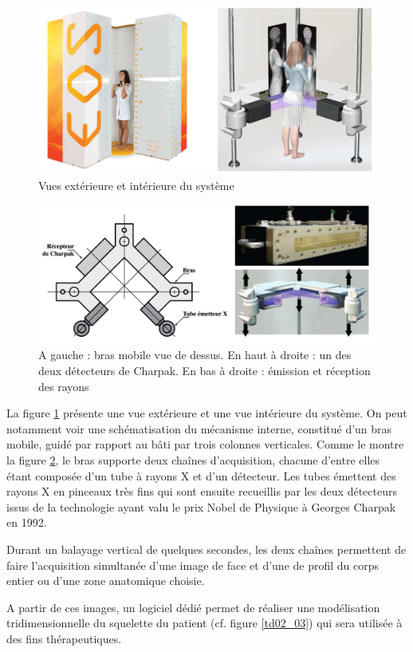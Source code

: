\begin{figure}[!h]
 \centering \includegraphics[width=0.8\linewidth]{img/td02_01}
 \caption{Vues extérieure et intérieure du système}
 \label{td02_01}
\end{figure}

\begin{figure}[!h]
 \centering \includegraphics[width=0.8\linewidth]{img/td02_02}
 \caption{A gauche : bras mobile vue de dessus. En haut à droite : un des deux détecteurs de Charpak. En bas à droite : émission et réception des rayons}
 \label{td02_02}
\end{figure}

La figure \ref{td02_01} présente une vue extérieure et une vue intérieure du système. On peut notamment voir une
schématisation du mécanisme interne, constitué d'un bras mobile, guidé par rapport au bâti par trois colonnes
verticales. Comme le montre la figure \ref{td02_02}, le bras supporte deux chaînes d'acquisition, chacune d'entre elles étant composée d'un tube à rayons X et d'un détecteur. Les tubes émettent des rayons X en pinceaux très fins qui sont ensuite recueillis par les deux détecteurs issus de la technologie ayant valu le prix Nobel de Physique à Georges Charpak en 1992.

Durant un balayage vertical de quelques secondes, les deux chaînes permettent de faire l'acquisition simultanée d'une image de face et d'une de profil du corps entier ou d'une zone anatomique choisie.

A partir de ces images, un logiciel dédié permet de réaliser une modélisation tridimensionnelle du squelette du patient (cf. figure \ref{td02_03}) qui sera utilisée à des fins thérapeutiques.


